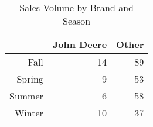 \begin{table}[ht]
\centering
\begin{tabular}{rrr}
  \hline
 & John Deere & Other \\ 
  \hline
Fall & 14 & 89 \\ 
  Spring & 9 & 53 \\ 
  Summer & 6 & 58 \\ 
  Winter & 10 & 37 \\ 
   \hline
\end{tabular}
\caption{Sales Volume by Brand and Season} 
\label{tab:brand_and_season_sales}
\end{table}
